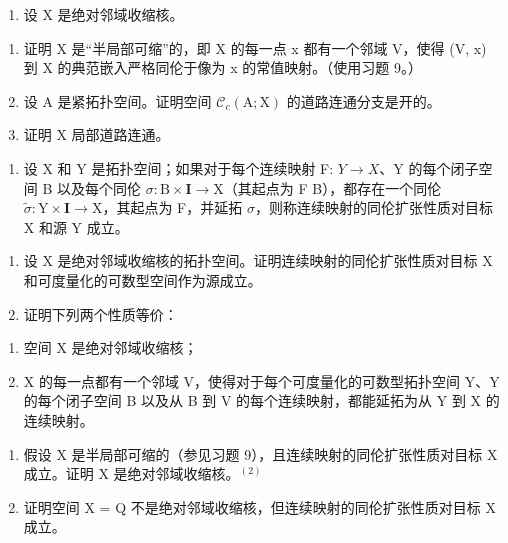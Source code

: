 \begin{enumerate}
\def\labelenumi{\arabic{enumi})}
\setcounter{enumi}{10}
\tightlist
\item
  设 X 是绝对邻域收缩核。
\end{enumerate}

\begin{enumerate}
\def\labelenumi{\alph{enumi})}
\item
  证明 X 是“半局部可缩”的，即 X 的每一点 x 都有一个邻域 V，使得 (V, x) 到 X 的典范嵌入严格同伦于像为 x 的常值映射。（使用习题 9。）
\item
  设 A 是紧拓扑空间。证明空间 \(\mathcal{C}_{c}(\mathrm{A};\mathrm{X})\) 的道路连通分支是开的。
\item
  证明 X 局部道路连通。
\end{enumerate}

\begin{enumerate}
\def\labelenumi{\arabic{enumi})}
\setcounter{enumi}{11}
\tightlist
\item
  设 X 和 Y 是拓扑空间；如果对于每个连续映射 F: \(Y \rightarrow X\)、Y 的每个闭子空间 B 以及每个同伦 \(\sigma\colon\mathrm{B}\times\mathbf{I}\to\mathrm{X}\)（其起点为 F \textbar{} B），都存在一个同伦 \(\widetilde{\sigma}\colon\mathrm{Y}\times\mathbf{I}\to\mathrm{X}\)，其起点为 F，并延拓 \(\sigma\)，则称连续映射的同伦扩张性质对目标 X 和源 Y 成立。
\end{enumerate}

\begin{enumerate}
\def\labelenumi{\alph{enumi})}
\item
  设 X 是绝对邻域收缩核的拓扑空间。证明连续映射的同伦扩张性质对目标 X 和可度量化的可数型空间作为源成立。
\item
  证明下列两个性质等价：
\end{enumerate}

\begin{enumerate}
\def\labelenumi{(\roman{enumi})}
\item
  空间 X 是绝对邻域收缩核；
\item
  X 的每一点都有一个邻域 V，使得对于每个可度量化的可数型拓扑空间 Y、Y 的每个闭子空间 B 以及从 B 到 V 的每个连续映射，都能延拓为从 Y 到 X 的连续映射。
\end{enumerate}

\begin{enumerate}
\def\labelenumi{\alph{enumi})}
\setcounter{enumi}{2}
\item
  假设 X 是半局部可缩的（参见习题 9），且连续映射的同伦扩张性质对目标 X 成立。证明 X 是绝对邻域收缩核。\(^{(2)}\)
\item
  证明空间 X = Q 不是绝对邻域收缩核，但连续映射的同伦扩张性质对目标 X 成立。
\end{enumerate}

